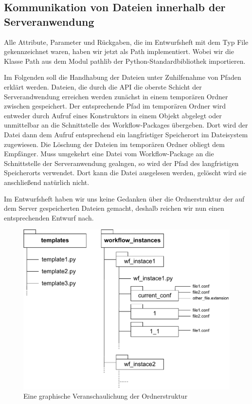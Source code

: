 




\subsection{Kommunikation von Dateien innerhalb der Serveranwendung}
Alle Attribute, Parameter und Rückgaben, die im Entwurfsheft mit dem Typ \glqq File\grqq{} gekennzeichnet waren, haben wir jetzt als Path implementiert. Wobei wir die Klasse Path aus dem Modul pathlib der Python-Standardbibliothek importieren.

Im Folgenden soll die Handhabung der Dateien unter Zuhilfenahme von Pfaden erklärt werden. Dateien, die durch die API die oberste Schicht der Serverandwendung erreichen werden zunächst in einem temporären Ordner zwischen gespeichert. Der entsprechende Pfad im temporären Ordner wird entweder durch Aufruf eines Konstruktors in einem Objekt abgelegt oder unmittelbar an die Schnittstelle des Workflow-Packages übergeben.
Dort wird der Datei dann dem Aufruf entsprechend ein langfristiger Speicherort im Dateisystem zugewiesen. Die Löschung der Dateien im temporären Ordner obliegt dem Empfänger. Muss umgekehrt eine Datei vom Workflow-Package an die Schnittstelle der Serveranwendung gealngen, so wird der Pfad des langfristigen Speicherorts verwendet. Dort kann die Datei ausgelesen werden, gelöscht wird sie anschließend natürlich nicht.

Im Entwurfsheft haben wir uns keine Gedanken über die Ordnerstruktur der auf dem Server gespeicherten Dateien gemacht, deshalb reichen wir nun einen entsprechenden Entwurf nach. 

\begin{figure}[h]
            \label{ordnerstruktur}
            \centerline{\includegraphics[scale=0.7]{res/ordnerstruktur.pdf}}
            \caption{Eine graphische Veranschaulichung der Ordnerstruktur}
\end{figure}

